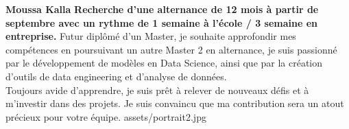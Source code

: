 \documentclass[theme]{cv_einstein}
\begin{document}
    \header
    {\textbf{Moussa Kalla}}
    {\textbf{Recherche d'une alternance de 12 mois à partir de septembre avec un rythme de 1 semaine à l'école / 3 semaine en entreprise.}}
    { 
Futur diplômé d’un Master, je souhaite approfondir mes compétences en poursuivant un autre Master 2 en
alternance, je suis passionné par le développement de modèles en Data Science, ainsi que par la création d'outils de data engineering et d'analyse de données. \\ Toujours avide d’apprendre, je suis prêt à relever de nouveaux défis et à m’investir dans des projets. Je suis
convaincu que ma contribution sera un atout précieux pour votre équipe.
    }
    {assets/portrait2.jpg}


    \vspace{\headerheight} %
\end{document}
